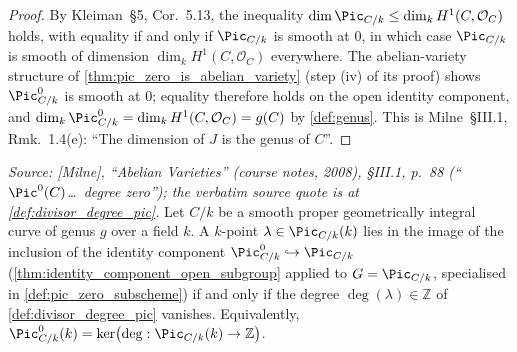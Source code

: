 \begin{proof}
  By Kleiman~\S 5,
  Cor.~5.13, the inequality
  \(\dim \Pic_{C/k} \le \dim_k H^1(C, \mathcal{O}_C)\) holds, with
  equality if and only if \(\Pic_{C/k}\) is smooth at \(0\), in which
  case \(\Pic_{C/k}\) is smooth of dimension \(\dim_k H^1(C,
  \mathcal{O}_C)\) everywhere. The abelian-variety structure of
  \cref{thm:pic_zero_is_abelian_variety} (step (iv) of its proof)
  shows \(\Pic^0_{C/k}\) is smooth at \(0\); equality therefore holds
  on the open identity component, and
  \(\dim_k \Pic^0_{C/k} = \dim_k H^1(C, \mathcal{O}_C) = g(C)\)
  by \cref{def:genus}. This is Milne~\S III.1, Rmk.~1.4(e): ``The
  dimension of \(J\) is the genus of \(C\)''.
\end{proof}

\begin{theorem}

  \label{thm:pic_zero_k_points_iff_degree_zero}

  \textit{Source: [Milne], ``Abelian Varieties'' (course notes, 2008),
  \S III.1, p.~88 (``\(\Pic^0(C)\)\dots\ degree zero''); the verbatim
  source quote is at \cref{def:divisor_degree_pic}.}
  Let \(C/k\) be a smooth proper geometrically integral curve of genus
  \(g\) over a field \(k\). A \(k\)-point
  \(\lambda \in \Pic_{C/k}(k)\) lies in the image of the inclusion of
  the identity component \(\Pic^0_{C/k} \hookrightarrow \Pic_{C/k}\)
  (\cref{thm:identity_component_open_subgroup} applied to
  \(G = \Pic_{C/k}\), specialised in \cref{def:pic_zero_subscheme})
  if and only if the degree
  \(\deg(\lambda) \in \mathbb{Z}\) of \cref{def:divisor_degree_pic}
  vanishes. Equivalently,
  \(\Pic^0_{C/k}(k) = \ker\bigl(\deg : \Pic_{C/k}(k) \to \mathbb{Z}\bigr)\).
\end{theorem}

